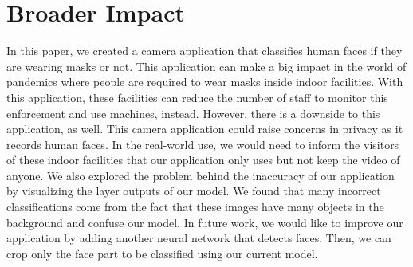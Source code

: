 \section*{Broader Impact}

In this paper, we created a camera application that classifies human faces if they are wearing masks or not.
This application can make a big impact in the world of pandemics where people are required to wear masks inside indoor facilities.
With this application, these facilities can reduce the number of staff to monitor this enforcement and use machines, instead.
However, there is a downside to this application, as well.
This camera application could raise concerns in privacy as it records human faces.
In the real-world use, we would need to inform the visitors of these indoor facilities that our application only uses but not keep the video of anyone.
We also explored the problem behind the inaccuracy of our application by visualizing the layer outputs of our model.
We found that many incorrect classifications come from the fact that these images have many objects in the background and confuse our model.
In future work, we would like to improve our application by adding another neural network that detects faces.
Then, we can crop only the face part to be classified using our current model.
